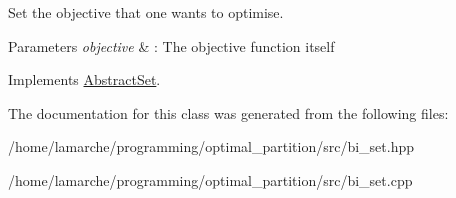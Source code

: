 Set the objective that one wants to optimise. 


\begin{DoxyParams}{Parameters}
{\em objective} & \-: The objective function itself \\
\hline
\end{DoxyParams}


Implements \hyperlink{classAbstractSet_a7aef71679a18ab7965d1098da15b26c2}{Abstract\-Set}.



The documentation for this class was generated from the following files\-:\begin{DoxyCompactItemize}
\item 
/home/lamarche/programming/optimal\-\_\-partition/src/bi\-\_\-set.\-hpp\item 
/home/lamarche/programming/optimal\-\_\-partition/src/bi\-\_\-set.\-cpp\end{DoxyCompactItemize}
